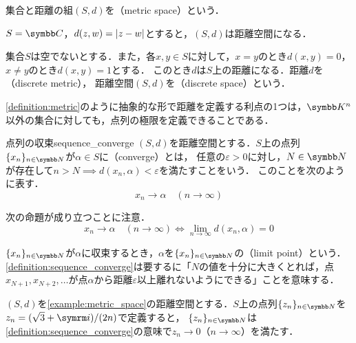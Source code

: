 \documentclass[../../main]{subfiles}
\begin{document}
集合と距離の組\((S,d)\)を（metric space）という．

\begin{example}
  \label{example:metric_space}
  \(S=\numset{C}\)，\(d(z,w)=\lvert z-w\rvert\)とすると，\((S,d)\)は距離空間になる．
\end{example}

\begin{example}[離散距離]
  \label{example:discrete_metric}
  集合\(S\)は空でないとする．また，各\(x,y\in S\)に対して，\(x=y\)のとき\(d(x,y)=0\)，\(x\neq y\)のとき\(d(x,y)=1\)とする．
  このとき\(d\)は\(S\)上の距離になる．距離\(d\)を（discrete metric），
  距離空間\((S,d)\)を（discrete space）という．
\end{example}

\cref{definition:metric}のように抽象的な形で距離を定義する利点の1つは，\(\numset{K}^n\)以外の集合に対しても，点列の極限を定義できることである．

\begin{definition}{点列の収束}{sequence_converge}
  \((S,d)\)を距離空間とする．\(S\)上の点列\(\seq{x_n}_{n\in\numset{N}}\)が\(\alpha\in S\)に（converge）とは，
  任意の\(\varepsilon>0\)に対し，\(N\in\numset{N}\)が存在して\(n>N\implies d(x_n,\alpha)<\varepsilon\)を満たすことをいう．
  このことを次のように表す．
  \[
    x_n\to\alpha\quad(n\to\infty)
  \]
\end{definition}

\begin{note}
  次の命題が成り立つことに注意．
  \[
    x_n \to \alpha\quad(n\to\infty)
    \iff\lim_{n\to\infty}d(x_n,\alpha) = 0
  \]
\end{note}

\(\seq{x_n}_{n\in\numset{N}}\)が\(\alpha\)に収束するとき，\(\alpha\)を\(\seq{x_n}_{n\in\numset{N}}\)の（limit point）という．
\cref{definition:sequence_converge}は要するに「\(N\)の値を十分に大きくとれば，点\(x_{N+1},x_{N+2},\dotsc\)が点\(\alpha\)から距離\(\varepsilon\)以上離れないようにできる」ことを意味する．

\begin{example}
  \label{example:complex_planes_convergence}
  \((S,d)\)を\cref{example:metric_space}の距離空間とする．\(S\)上の点列\(\seq{z_n}_{n\in\numset{N}}\)を\(z_n=(\sqrt{3}+\iuni)/(2n)\)で定義すると，
  \(\seq{z_n}_{n\in\numset{N}}\)は\cref{definition:sequence_converge}の意味で\(z_n\to 0\)（\(n\to\infty\)）を満たす．
\end{example}
\end{document}
